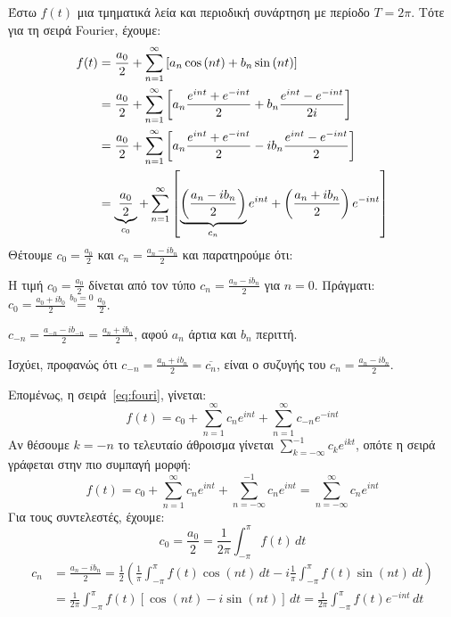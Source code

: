      Έστω $f(t)$ μια τμηματικά λεία και περιοδική συνάρτηση με περίοδο $ T=2 \pi $. Τότε 
     για τη σειρά Fourier, έχουμε:
     \begin{align}\label{eq:fouri}
       f(t) &= \frac{a_{0}}{2} + \sum_{n=1}^{\infty} \left[a_{n} \cos{(nt)} + b_{n}
       \sin{(nt)}\right] \notag \\
            &= \frac{a_{0}}{2} + \sum_{n=1}^{\infty} \left[a_{n} \frac{e^{int}+e^{-int}}{2} +
            b_{n} \frac{e^{int}-e^{-int}}{2i} \right] \notag \\
            &= \frac{a_{0}}{2} + \sum_{n=1}^{\infty} \left[a_{n} \frac{e^{int}+e^{-int}}{2} - i
            b_{n} \frac{e^{int}-e^{-int}}{2}\right] \notag \\
            &= \underbrace{\frac{a_{0}}{2}}_{c_{0}} + \sum_{n=1}^{\infty}
            \left[\underbrace{\left(\frac{a_{n}-ib_{n}}{2}\right)}_{c_{n}}e^{int} +
            \left(\frac{a_{n}+ib_{n}}{2}\right) e^{-int}\right]
       \end{align}
       Θέτουμε $ c_{0} = \frac{a_{0}}{2} $ και $ c_{n} = \frac{a_{n}-ib_{n}}{2} $ και
       παρατηρούμε ότι:
       \begin{myitemize}
         \item Η τιμή $ c_{0} = \frac{a_{0}}{2} $ δίνεται από τον τύπο $ c_{n} =
           \frac{a_{n}- ib_{n}}{2} $ για $ n=0 $. Πράγματι: 
           $ c_{0} = \frac{a_{0}+ib_{0}}{2} \overset{b_{0}=0}{=} \frac{a_{0}}{2}$.
         \item 
           $ c_{-n} = \frac{a_{-n}-ib_{-n}}{2} = \frac{a_{n}+ib_{n}}{2} $, αφού 
           $ a_{n} $ άρτια και $ b_{n} $ περιττή.
         \item Ισχύει, προφανώς ότι $ c_{-n} = \frac{a_{n}+ib_{n}}{2} = \overline{c_{n}}
           $, είναι ο συζυγής του $ c_{n} = \frac{a_{n}-i b_{n}}{2} $.
       \end{myitemize}
       Επομένως, η σειρά~\eqref{eq:fouri}, γίνεται:
       \[
         f(t) = c_{0} + \sum_{n=1}^{\infty} c_{n} e^{int} + \sum_{n=1}^{\infty} c_{-n}
         e^{-int} 
       \] 
       Αν θέσουμε $ k=-n $ το τελευταίο άθροισμα γίνεται $ \sum_{k=-\infty}^{-1} c_{k}
       e^{ikt} $, οπότε η σειρά γράφεται στην πιο συμπαγή μορφή:
       \[
         f(t) = c_{0} + \sum_{n=1}^{\infty} c_{n} e^{int} + \sum_{n=-\infty}^{-1} c_{n}
         e^{int} = \sum_{n=- \infty}^{\infty} c_{n} e^{int}
       \]
       Για τους συντελεστές, έχουμε:
       \[
         c_{0} = \frac{a_{0}}{2} = \frac{1}{2\pi} \int _{- \pi }^{\pi} f(t) \,{dt}
       \] 
       \begin{align*}
         c_{n} &= \frac{a_{n}-ib_{n}}{2} = \frac{1}{2} 
         \left(\frac{1}{\pi} \int _{- \pi }^{\pi } f(t) \cos{(nt)} \,{dt} - i
         \frac{1}{\pi} \int _{- \pi }^{\pi } f(t) \sin{(nt)} \,{dt}  \right) \\ 
               &= \frac{1}{2 \pi} \int _{- \pi }^{\pi} f(t) [\cos{(nt)} - i \sin{(nt)}] 
               \,{dt} = \frac{1}{2 \pi} \int _{- \pi }^{\pi } f(t) e^{-int} \,{dt}
       \end{align*} 
